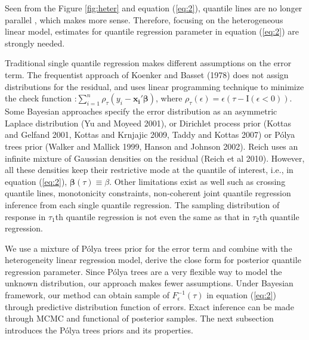 \documentclass[12pt]{article}
\newcommand{\polya}{P\'{o}lya}
\begin{document}
Seen from the Figure \ref{fig:heter} and equation (\ref{eq:2}), quantile lines
are no longer parallel , which makes more sense. Therefore, focusing on the heterogeneous linear model, estimates
for quantile regression parameter in equation (\ref{eq:2}) are strongly
needed. 

Traditional single quantile regression makes different assumptions on
the error term. The frequentist approach of  Koenker and Basset (1978) does not
assign distributions for the residual, and uses linear
programming technique to minimize the check function :$\sum_{i=1}^n
\rho_{\tau}(y_i - \bm{x_i'\beta})$, where $\rho_{\tau}(\epsilon) =
\epsilon (\tau- \mathrm{I}(\epsilon < 0))$. 
   Some Bayesian 
approaches specify the error distribution as an asymmetric Laplace
distribution (Yu and Moyeed 2001), or Dirichlet process prior (Kottas
and Gelfand 2001, Kottas and Krnjajic 2009, Taddy and Kottas 2007) or
\polya{} trees prior (Walker and Mallick 1999, Hanson and Johnson
2002). Reich uses an infinite mixture of Gaussian densities on the
residual (Reich et al 2010). However, all these densities keep their
restrictive mode at the quantile of interest, i.e., in equation
(\ref{eq:2}), $\bm{\beta}(\tau) \equiv \beta$. Other limitations exist
as well such as crossing quantile lines, monotonicity constraints,
non-coherent joint quantile regression inference from each single
quantile regression. The sampling distribution of response in
$\tau_1$th quantile regression is not even the same as that in
$\tau_2$th quantile regression.

We use a mixture of \polya{} trees prior for the error term and
combine with the heterogeneity linear regression model, derive the
close form for posterior quantile regression parameter. Since \polya{}
trees are a very flexible way to model the unknown distribution, our
approach makes fewer assumptions. Under Bayesian framework, our method
can obtain sample of $F^{-1}_{\epsilon}(\tau)$ in equation
(\ref{eq:2}) through predictive distribution function of errors. Exact
inference can be made through MCMC and functional of posterior
samples. The next subsection introduces the \polya{} trees priors and
its properties.
\end{document}
